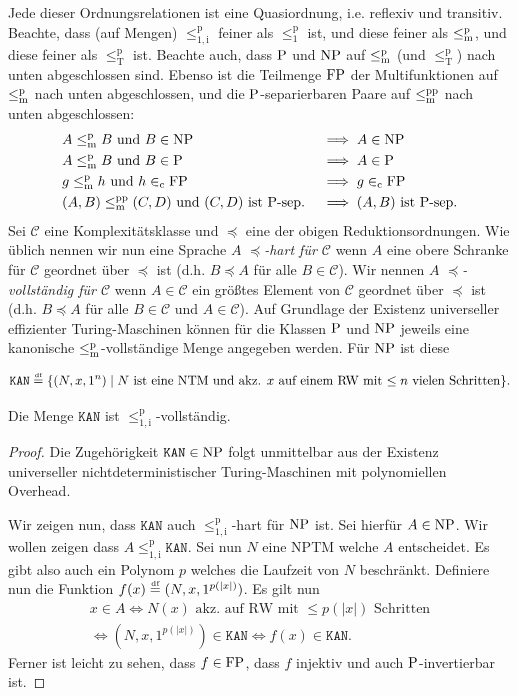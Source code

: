 Jede dieser Ordnungsrelationen ist eine Quasiordnung, i.e. reflexiv und transitiv.
Beachte, dass (auf Mengen) $\leq_\mathrm{1,i}^\mathrm{p}$ feiner als $\leq_1^\mathrm{p}$ ist, und diese feiner als $\leqmp$, und diese feiner als $\leq_\mathrm{T}^\mathrm p$ ist.
Beachte auch, dass $\P$ und $\NP$ auf $\leqmp$ (und $\leq_\mathrm T^\mathrm p$) nach unten abgeschlossen sind.
Ebenso ist die Teilmenge $\FP$ der Multifunktionen auf $\leqmp$ nach unten abgeschlossen, und die $\P$-separierbaren Paare auf $\leqmpp$ nach unten abgeschlossen:
\begin{alignat*}{2}
    &A\leqmp B \text{ und } B\in\NP &&\implies A\in\NP\\
    &A\leqmp B \text{ und } B\in\P &&\implies A\in\P\\
    &g\leqmp h \text{ und } h\inc\FP &&\implies g\inc\FP\\
    &(A,B)\leqmpp (C,D) \text{ und $(C,D)$ ist $\P$-sep.} &&\implies \text{$(A,B)$ ist $\P$-sep.}
\end{alignat*}
Sei $\mathcal C$ eine Komplexitätsklasse und $\preceq$ eine der obigen Reduktionsordnungen.
Wie üblich nennen wir nun eine Sprache $A$ \emph{$\preceq$-hart für $\mathcal C$} wenn $A$ eine obere Schranke für $\mathcal C$ geordnet über $\preceq$  ist (d.h. $B\preceq A$ für alle $B\in\mathcal C$).
Wir nennen $A$ \emph{$\preceq$-vollständig für $\mathcal C$} wenn $A\in\mathcal C$ ein größtes Element von $\mathcal C$ geordnet über $\preceq$ ist (d.h. $B\preceq A$ für alle $B\in\mathcal C$ und $A\in\mathcal C$).
Auf Grundlage der Existenz universeller effizienter Turing-Maschinen können für die Klassen $\P$ und $\NP$ jeweils eine kanonische $\leqmp$-vollständige Menge angegeben werden. Für $\NP$ ist diese
\begin{definition}
\[ \mathtt{KAN} \defeq \{ (N, x, 1^n) \mid \text{$N$ ist eine NTM und akz. $x$ auf einem RW mit $\leq n$ vielen Schritten} \}.\qedhere \]
\end{definition}
\begin{lemma}
    Die Menge $\mathtt{KAN}$ ist $\leq_\mathrm{1,i}^\mathrm{p}$-vollständig.
\end{lemma}
\begin{proof}
    Die Zugehörigkeit $\mathtt{KAN}\in\NP$ folgt unmittelbar aus der Existenz universeller nichtdeterministischer Turing-Maschinen mit polynomiellen Overhead.

    Wir zeigen nun, dass $\mathtt{KAN}$ auch $\leq_\mathrm{1,i}^\mathrm{p}$-hart für $\NP$ ist.
    Sei hierfür $A\in\NP$. Wir wollen zeigen dass $A \leq_\mathrm{1,i}^\mathrm{p} \mathtt{KAN}$. Sei nun $N$ eine NPTM welche $A$ entscheidet. Es gibt also auch ein Polynom $p$ welches die Laufzeit von $N$ beschränkt.
    Definiere nun die Funktion $f(x) \defeq (N, x, 1^{p(|x|)})$. Es gilt nun
    \begin{gather*}
        x\in A \iff N(x)\text{ akz. auf RW mit $\leq p(|x|)$ Schritten}\\
        \iff (N, x, 1^{p(|x|)}) \in \mathtt{KAN} \iff f(x) \in \mathtt{KAN}.
    \end{gather*}
    Ferner ist leicht zu sehen, dass $f\in \FP$, dass $f$ injektiv und auch $\P$-invertierbar ist.
\end{proof}


